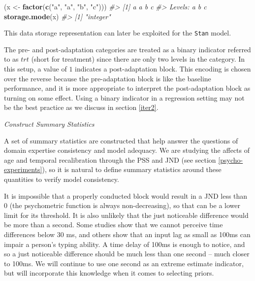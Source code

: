 \documentclass[11pt, oneside, openany]{scrbook}
\newenvironment{Shaded}{\begin{snugshade}}{\end{snugshade}}
\newcommand{\CommentTok}[1]{\textcolor[rgb]{0.56,0.35,0.01}{\textit{#1}}}
\newcommand{\FunctionTok}[1]{\textcolor[rgb]{0.13,0.29,0.53}{\textbf{#1}}}
\newcommand{\NormalTok}[1]{#1}
\newcommand{\OtherTok}[1]{\textcolor[rgb]{0.56,0.35,0.01}{#1}}
\newcommand{\StringTok}[1]{\textcolor[rgb]{0.31,0.60,0.02}{#1}}
\begin{document}

\begin{Shaded}
\begin{Highlighting}[]
\NormalTok{(x }\OtherTok{\textless{}{-}} \FunctionTok{factor}\NormalTok{(}\FunctionTok{c}\NormalTok{(}\StringTok{"a"}\NormalTok{, }\StringTok{"a"}\NormalTok{, }\StringTok{"b"}\NormalTok{, }\StringTok{"c"}\NormalTok{)))}
\CommentTok{\#\textgreater{} [1] a a b c}
\CommentTok{\#\textgreater{} Levels: a b c}
\FunctionTok{storage.mode}\NormalTok{(x)}
\CommentTok{\#\textgreater{} [1] "integer"}
\end{Highlighting}
\end{Shaded}


This data storage representation can later be exploited for the \texttt{Stan} model.

The pre- and post-adaptation categories are treated as a binary indicator referred to as \(trt\) (short for treatment) since there are only two levels in the category. In this setup, a value of \(1\) indicates a post-adaptation block. This encoding is chosen over the reverse because the pre-adaptation block is like the baseline performance, and it is more appropriate to interpret the post-adaptation block as turning on some effect. Using a binary indicator in a regression setting may not be the best practice as we discuss in section \ref{iter2}.

\emph{Construct Summary Statistics}

A set of summary statistics are constructed that help answer the questions of domain expertise consistency and model adequacy. We are studying the affects of age and temporal recalibration through the PSS and JND (see section \ref{psycho-experiments}), so it is natural to define summary statistics around these quantities to verify model consistency.

It is impossible that a properly conducted block would result in a JND less than 0 (the psychometric function is always non-decreasing), so that can be a lower limit for its threshold. It is also unlikely that the just noticeable difference would be more than a second. Some studies show that we cannot perceive time differences below 30 ms, and others show that an input lag as small as 100ms can impair a person's typing ability. A time delay of 100ms is enough to notice, and so a just noticeable difference should be much less than one second -- much closer to 100ms. We will continue to use one second as an extreme estimate indicator, but will incorporate this knowledge when it comes to selecting priors.
\end{document}
